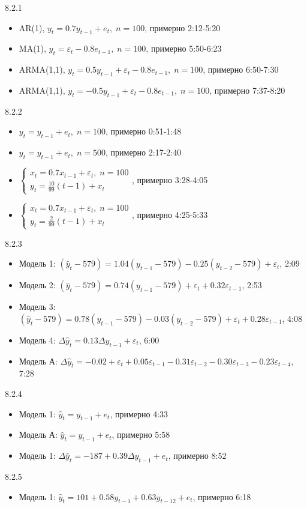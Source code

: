 \documentclass[12pt,a4paper]{article}
\newcommand{\e}{\varepsilon}
\newcommand{\hy}{\hat{y}}
\begin{document}
8.2.1

\begin{itemize}

\item AR(1), $y_t=0.7y_{t-1}+e_t, \; n=100$, примерно  2:12-5:20
\item MA(1), $y_t=\e_t -0.8e_{t-1}, \; n=100$, примерно  5:50-6:23
\item ARMA(1,1), $y_t=0.5y_{t-1}+\e_t-0.8e_{t-1}, \; n=100$, примерно  6:50-7:30
\item ARMA(1,1), $y_t=-0.5y_{t-1}+\e_t-0.8e_{t-1}, \; n=100$, примерно  7:37-8:20

\end{itemize}

8.2.2

\begin{itemize}

\item $y_t=y_{t-1}+e_t, \; n=100$, примерно  0:51-1:48
\item $y_t=y_{t-1}+e_t, \; n=500$, примерно  2:17-2:40
\item 
$
\begin{cases}
x_t=0.7x_{t-1}+\e_t, \; n=100 \\
y_t=\frac{10}{99}(t-1)+x_t
\end{cases}
$, примерно  3:28-4:05
\item 
$
\begin{cases}
x_t=0.7x_{t-1}+\e_t, \; n=100 \\
y_t=\frac{2}{99}(t-1)+x_t
\end{cases}
$, примерно  4:25-5:33
\end{itemize}

8.2.3

\begin{itemize}
\item Модель 1: $(\hy_t-579)=1.04(y_{t-1}-579)-0.25(y_{t-2}-579)+\e_t$, 2:09
\item Модель 2: $(\hy_t-579)=0.74(y_{t-1}-579)+\e_t+0.32\e_{t-1}$, 2:53
\item Модель 3: $(\hy_t-579)=0.78(y_{t-1}-579)-0.03(y_{t-2}-579)+\e_t+0.28\e_{t-1}$, 4:08
\item Модель 4: $\Delta \hy_t=0.13 \Delta y_{t-1} + \e_t$, 6:00 
\item Модель А: $\Delta \hy_t=-0.02 + \e_t + 0.05\e_{t-1}-0.31\e_{t-2}-0.30\e_{t-3}-0.23\e_{t-4}$, 7:28
\end{itemize}

8.2.4
\begin{itemize}
\item Модель 1: $\hy_t=y_{t-1}+e_t$, примерно  4:33
\item Модель А: $\hy_t=y_{t-1}+e_t$, примерно  5:58
\item Модель 1: $\Delta\hy_t=-187+ 0.39\Delta y_{t-1}+e_t$, примерно  8:52
\end{itemize}

8.2.5
\begin{itemize}
\item Модель 1: $\hy_t=101 + 0.58y_{t-1}+0.63y_{t-12}+e_t$, примерно  6:18
\end{itemize}
\end{document}
